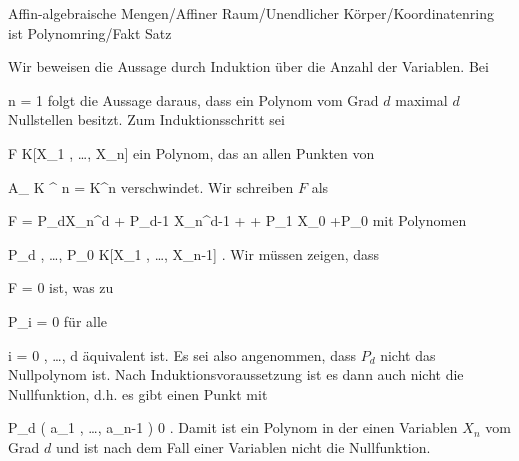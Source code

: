 {Affin-algebraische Mengen/Affiner Raum/Unendlicher Körper/Koordinatenring ist Polynomring/Fakt}
{Satz}
{}
{



\faktsituation {}
\faktzusatz {}
\faktzusatz {}





}
{





Wir beweisen die Aussage durch Induktion über die Anzahl der Variablen. Bei

\mavergleichskette
{\vergleichskette
{ n
}
{ = }{ 1
}
{  }{
}
{    }{
}
{   }{
}
}
{}{}{}
folgt die Aussage daraus, dass ein Polynom vom Grad $d$ maximal $d$ Nullstellen besitzt. Zum Induktionsschritt sei

\mavergleichskette
{\vergleichskette
{ F
}
{ \in }{ K[X_1 , \ldots , X_n]
}
{  }{
}
{    }{
}
{   }{
}
}
{}{}{}
ein Polynom, das an allen Punkten von

\mavergleichskette
{\vergleichskette
{ { {\mathbb A}_{  K  }^{  n   } }
}
{ = }{ K^n
}
{  }{
}
{    }{
}
{   }{
}
}
{}{}{}
verschwindet. Wir schreiben $F$ als

\mavergleichskettedisp
{\vergleichskette
{ F
}
{ =} { P_dX_n^d + P_{d-1} X_n^{d-1} + \cdots + P_1 X_0 +P_0
}
{ } {
}
{ } {
}
{ } {
}
}
{}{}{}
mit Polynomen

\mavergleichskette
{\vergleichskette
{ P_d , \ldots , P_0
}
{ \in }{ K[X_1 , \ldots , X_{n-1}]
}
{  }{
}
{    }{
}
{   }{
}
}
{}{}{.}
Wir müssen zeigen, dass

\mavergleichskette
{\vergleichskette
{ F
}
{ = }{ 0
}
{  }{
}
{    }{
}
{   }{
}
}
{}{}{}
ist, was zu

\mavergleichskette
{\vergleichskette
{ P_i
}
{ = }{ 0
}
{  }{
}
{    }{
}
{   }{
}
}
{}{}{}
für alle

\mavergleichskette
{\vergleichskette
{ i
}
{ = }{ 0 , \ldots , d
}
{  }{
}
{    }{
}
{   }{
}
}
{}{}{}
äquivalent ist. Es sei also
 {} {}
angenommen, dass $P_d$ nicht das Nullpolynom ist. Nach Induktionsvoraussetzung ist es dann auch nicht die Nullfunktion, d.h. es gibt einen Punkt
 mit

\mavergleichskette
{\vergleichskette
{ P_d \left(  a_1 , \ldots , a_{n-1}  \right)
}
{ \neq }{ 0
}
{  }{
}
{    }{
}
{   }{
}
}
{}{}{.}
Damit ist
 ein Polynom in der einen Variablen $X_{n}$ vom Grad $d$ und ist nach dem Fall einer Variablen nicht die Nullfunktion.




}




